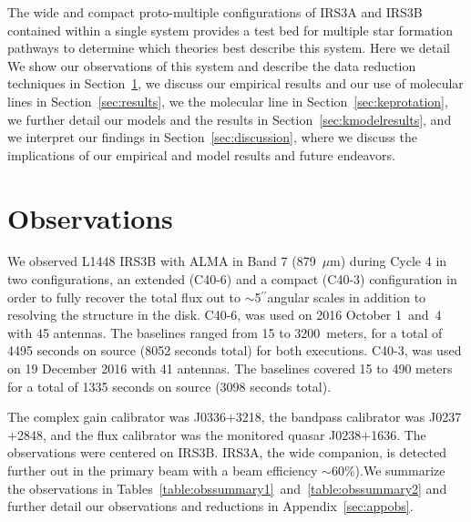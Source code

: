 \documentclass[twocolumn, 12pt,trackchanges]{aastex63}
\renewcommand{\arcsec}{$^{\prime\prime}$}
\renewcommand{\micron}{$\mu$m}
\newcommand{\ab}{$\sim$}
\begin{document}
The wide and compact proto-multiple configurations of IRS3A and IRS3B contained within a single system provides a test bed for multiple star formation pathways to determine which theories best describe this system. Here we detail  We show our observations of this system and describe the data reduction techniques in Section~\ref{sec:obs}, we discuss our empirical results and our use of molecular lines in Section~\ref{sec:results}, we  the molecular line  in Section~\ref{sec:keprotation}, we further detail our models and the results in Section~\ref{sec:kmodelresults}, and we interpret our findings in Section~\ref{sec:discussion}, where we discuss the implications of our empirical and model results and future endeavors. 

\section{Observations}\label{sec:obs}
We observed L1448 IRS3B with ALMA in Band 7 (879~\micron) during Cycle 4 in two configurations, an extended (C40-6) and a compact (C40-3) configuration in order to fully recover the total flux out to \ab5\arcsec\space angular scales in addition to resolving the structure in the disk. C40-6, was used on 2016 October 1~and~4 with 45 antennas. The baselines ranged from 15 to 3200~meters, for a total of 4495 seconds on source (8052 seconds total) for both executions. C40-3, was used on 19 December 2016 with 41 antennas. The baselines covered 15 to 490 meters for a total of 1335 seconds on source (3098 seconds total).

The complex gain calibrator was J0336$+$3218, the bandpass calibrator was J0237$+$2848, and the flux calibrator was the monitored quasar J0238$+$1636. The observations were centered on IRS3B. IRS3A, the wide companion, is detected further out in the primary beam with a beam efficiency \ab60\%).We summarize the observations in Tables~\ref{table:obssummary1}~and~\ref{table:obssummary2} and further detail our observations and reductions in Appendix~\ref{sec:appobs}.
\end{document}
